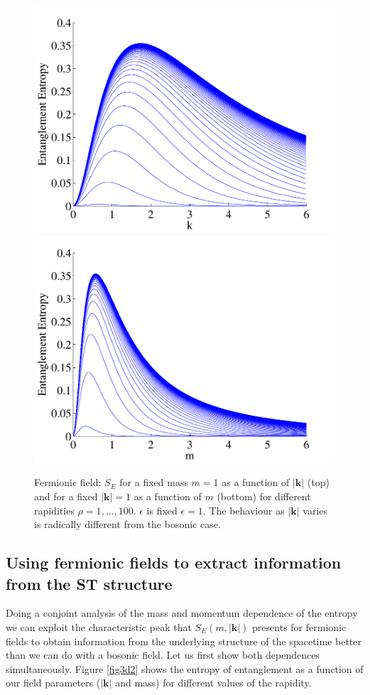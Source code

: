 \begin{figure}[H]
\begin{center}
\includegraphics[width=.61\textwidth]{variousrho}
\includegraphics[width=.61\textwidth]{Sofmass}
\end{center}
\caption{ Fermionic field: $S_E$ for a fixed mass $m=1$ as a function of $|\bm k|$ (top) and for a fixed $|\bm k|=1$ as a function of $m$ (bottom) for different rapidities $\rho=1,\dots,100$. $\epsilon$ is fixed $\epsilon=1$. The behaviour as $|\bm k|$ varies is radically different from the bosonic case.}
\label{peaked}
\end{figure}


\subsection{Using fermionic fields to extract information from the ST structure}



Doing a conjoint analysis of the mass and momentum dependence of the entropy we can exploit the characteristic peak that $S_E(m,|\bm k|)$ presents for fermionic fields to obtain information from the underlying structure of the spacetime better than we can do with a bosonic field. Let us first show both dependences simultaneously. Figure \ref{fig3d2} shows the entropy of entanglement as a function of our field parameters ($|\bm k|$ and mass)  for different values of the rapidity.

